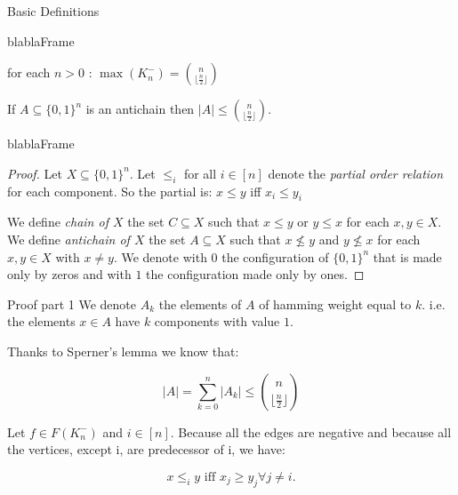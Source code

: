 \documentclass{beamer}
\newcommand{\floor}[1]{\lfloor #1 \rfloor}
\begin{document}
\begin{section}{Basic Definitions}
\begin{frame}{blablaFrame}
    \begin{theorem}
    for each $n > 0$ :
    $\max(K_n^-) = \binom{n}{\floor{\frac{n}{2}}}$
    \end{theorem}
    
    \begin{lemma}[Sperner 1928]
    If $A \subseteq \{0,1\}^n$ is an antichain then $|A| \leq \binom{n}{\floor{\frac{n}{2}}}$.
    \end{lemma}
\end{frame}

\begin{frame}{blablaFrame}
    \begin{proof}
    \justifying
    Let $X \subseteq \{0, 1\}^n$. Let $\leq_i$ for all $i \in [n]$  denote the \textit{partial order relation} for each component. So the partial is:
        $x \leq y$ iff $x_i \leq y_i$
    
    We define \textit{chain of $X$} the set $C \subseteq X$ such that $x \leq y$ or $y \leq x$ for each $x, y \in X$.
    We define \textit{antichain of $X$} the set $A \subseteq X$ such that $x \nleq y$ and $y \nleq x$ for each $x, y \in X$ with $x \neq y$.
    We denote with $0$ the configuration of $\{0,1\}^n$ that is made only by zeros and with $1$ the configuration made only by ones.
    \end{proof}
\end{frame}

\begin{frame}
    
    \begin{block}{Proof part 1}
    We denote $A_k$ the elements of $A$ of hamming weight equal to $k$. i.e. the elements $x \in A$ have $k$ components with value $1$.
    
    
    

    Thanks to Sperner's lemma we know that:
    
    \[
            |A| = \sum_{k=0}^n |A_k| \leq \binom{n}{\floor{\frac{n}{2}}}
    \]
    
    Let $f \in F(K_n^-)$ and $i \in [n]$. Because all the edges are negative and because all the vertices, except i, are predecessor of i, we have: 
    
    \[
    x \leq_i y \text{ iff } x_j \geq y_j \forall j \neq i.
    \]
    
    \end{block}
\end{frame}


\end{section}
\end{document}
